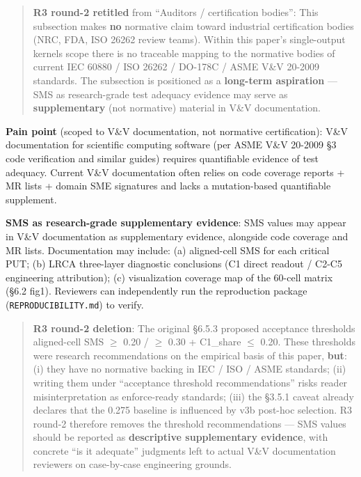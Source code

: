 \documentclass[review,12pt,authoryear]{elsarticle}
\begin{document}
\begin{quote}
\textbf{R3 round-2 retitled} from ``Auditors / certification bodies'':
This subsection makes \textbf{no} normative claim toward industrial
certification bodies (NRC, FDA, ISO 26262 review teams). Within this
paper's single-output kernels scope there is no traceable mapping to the
normative bodies of current IEC 60880 / ISO 26262 / DO-178C / ASME V\&V
20-2009 standards. The subsection is positioned as a \textbf{long-term
aspiration} --- SMS as research-grade test adequacy evidence may serve
as \textbf{supplementary} (not normative) material in V\&V
documentation.
\end{quote}

\textbf{Pain point} (scoped to V\&V documentation, not normative
certification): V\&V documentation for scientific computing software
(per ASME V\&V 20-2009 §3 code verification and similar guides) requires
quantifiable evidence of test adequacy. Current V\&V documentation often
relies on code coverage reports + MR lists + domain SME signatures and
lacks a mutation-based quantifiable supplement.

\textbf{SMS as research-grade supplementary evidence}: SMS values may
appear in V\&V documentation as supplementary evidence, alongside code
coverage and MR lists. Documentation may include: (a) aligned-cell SMS
for each critical PUT; (b) LRCA three-layer diagnostic conclusions (C1
direct readout / C2-C5 engineering attribution); (c) visualization
coverage map of the 60-cell matrix (§6.2 fig1). Reviewers can
independently run the reproduction package (\texttt{REPRODUCIBILITY.md})
to verify.

\begin{quote}
\textbf{R3 round-2 deletion}: The original §6.5.3 proposed acceptance
thresholds aligned-cell SMS $\geq$ 0.20 / $\geq$ 0.30 + C1\_share $\leq$ 0.20. These
thresholds were research recommendations on the empirical basis of this
paper, \textbf{but}: (i) they have no normative backing in IEC / ISO /
ASME standards; (ii) writing them under ``acceptance threshold
recommendations'' risks reader misinterpretation as enforce-ready
standards; (iii) the §3.5.1 caveat already declares that the 0.275
baseline is influenced by v3b post-hoc selection. R3 round-2 therefore
removes the threshold recommendations --- SMS values should be reported
as \textbf{descriptive supplementary evidence}, with concrete ``is it
adequate'' judgments left to actual V\&V documentation reviewers on
case-by-case engineering grounds.
\end{quote}
\end{document}

